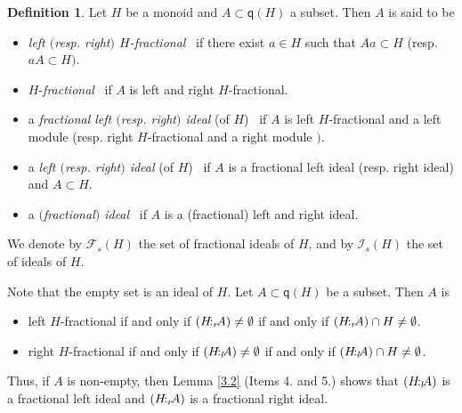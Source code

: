 \documentclass[a4paper]{amsart}
\theoremstyle{definition}
\newtheorem{definition}[theorem]{Definition}
\numberwithin{equation}{section}
\begin{document}
\medskip
\begin{definition} \label{3.3}
Let $H$ be a monoid and $A \subset \mathsf q (H)$ a subset.
Then $A$ is said to be
\begin{itemize}
\item {\it left $($resp. right$)$ $H$-fractional} \ if there exist $a \in H$ such that $Aa \subset H$ (resp. $aA \subset H )$.

\item $H$-{\it fractional} \ if $A$ is left and right $H$-fractional.

\item a  {\it fractional left $($resp. right$)$ ideal} (of $H$) \ if $A$ is left $H$-fractional and a left module (resp.  right $H$-fractional and  a right module $)$.

\item a {\it left $($resp. right$)$ ideal} (of $H$) \ if $A$ is a fractional left ideal (resp. right ideal) and $A \subset H$.

\item a {\it $($fractional$)$ ideal} \ if $A$ is a (fractional) left and
right ideal.
\end{itemize}
We denote by $\mathcal
F_s (H)$ the set of fractional ideals of $H$, and by $\mathcal I_s
(H)$ the set of ideals of $H$.
\end{definition}

\smallskip
Note that the empty set is an ideal of $H$. Let $A \subset \mathsf q (H)$ be a subset. Then $A$ is
\begin{itemize}
\item left $H$-fractional if and only if $(H {\negthinspace :_r \negthinspace} A) \ne
      \emptyset$ if and only if $(H {\negthinspace :_r \negthinspace} A) \cap H \ne
      \emptyset$.

\item right $H$-fractional if and only if $(H {\negthinspace :_l \negthinspace} A) \ne \emptyset$ if and only if $(H {\negthinspace :_l \negthinspace} A) \cap H \ne \emptyset$.
\end{itemize}
Thus, if $A$ is non-empty, then Lemma \ref{3.2} (Items 4. and 5.) shows that $(H {\negthinspace :_l \negthinspace} A)$ is a fractional left ideal and $(H {\negthinspace :_r \negthinspace} A)$ is a fractional right ideal.
\end{document}
